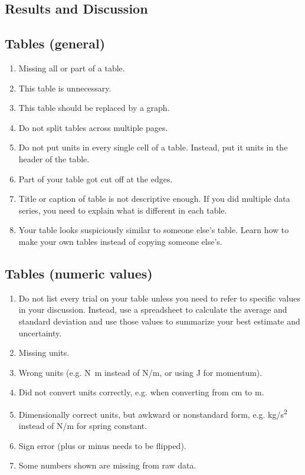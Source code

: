 \documentclass[12pt,letterpaper]{article}
\begin{document}
\begin{multicols}{2}
\section{Results and Discussion}

\subsection*{Tables (general)}

\begin{enumerate}[start=50]
  \item Missing all or part of a table.
  \item This table is unnecessary.
  \item This table should be replaced by a graph.
  \item Do not split tables across multiple pages.
  \item Do not put units in every single cell of a table.
    Instead, put it units in the header of the table.
  \item Part of your table got cut off at the edges.
  \item Title or caption of table is not descriptive enough.
    If you did multiple data series,
    you need to explain what is different in each table.
  \item Your table looks suspiciously similar to someone else's table.
    Learn how to make your own tables instead of copying someone else's.
\end{enumerate}

\subsection*{Tables (numeric values)}

\begin{enumerate}[start=60]
  \item Do not list every trial on your table
    unless you need to refer to specific values in your discussion.
    Instead, use a spreadsheet to calculate the average and standard deviation
    and use those values to summarize your best estimate and uncertainty.
  \item Missing units.
  \item Wrong units (e.g. \si{N.m} instead of \si{N/m},
    or using \si{J} for momentum).
  \item Did not convert units correctly,
    e.g. when converting from \si{cm} to \si{m}.
  \item Dimensionally correct units, but awkward or nonstandard form,
    e.g. \si{kg/s^2} instead of \si{N/m} for spring constant.
  \item Sign error (plus or minus needs to be flipped).
  \item Some numbers shown are missing from raw data.
\end{enumerate}


\end{multicols}
\end{document}
